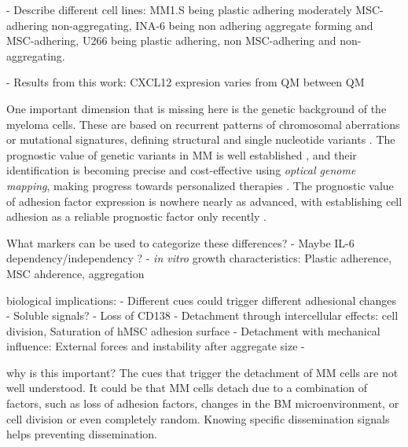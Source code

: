 


% 

\unnsubsection{\cadddiversitytitle}%
\label{sec:discussion_cadddiversity}%

- Describe different cell lines: MM1.S being plastic adhering moderately
MSC-adhering non-aggregating, INA-6 being non adhering aggregate forming and
MSC-adhering, U266 being plastic adhering, non MSC-adhering and
non-aggregating.

- Results from this work: CXCL12 expresion varies from QM between QM

One important dimension that is missing here is the genetic background of the
myeloma cells. These are based on recurrent patterns of chromosomal aberrations
or mutational signatures, defining structural and single nucleotide variants
\cite{kumarMultipleMyelomasCurrent2018a,
      hoangMutationalProcessesContributing2019}. The prognostic value of genetic
variants in MM is well established \cite{sharmaPrognosticRoleMYC2021}, and their
identification is becoming precise and cost-effective using \emph{optical
      genome mapping}, making progress towards personalized therapies
\cite{zouComprehensiveApproachEvaluate2024,
      budurleanIntegratingOpticalGenome2024}. The prognostic value of adhesion factor
expression is nowhere nearly as advanced, with establishing cell adhesion as a
reliable prognostic factor only recently
\cite{huDevelopmentCellAdhesionbased2024}.

What markers can be used to categorize these differences?
- Maybe IL-6 dependency/independency \cite{sprynskiRoleIGF1Major2009}?
- \textit{in vitro} growth characteristics: Plastic adherence, MSC ahderence, aggregation

\unnsubsection{\caddtriggertitle}%
\label{sec:discussion_caddtrigger}%

biological implications:
- Different cues could trigger different adhesional changes
- Soluble signals?
- Loss of CD138 \cite{akhmetzyanovaDynamicCD138Surface2020}
- Detachment through intercellular effects: cell division, Saturation of hMSC adhesion surface
- Detachment with mechanical influence: External forces and instability after aggregate size
-


why is this important?
The cues that trigger the detachment of MM cells are not well understood. It
could be that MM cells detach due to a combination of factors, such as loss of
adhesion factors, changes in the BM microenvironment, or cell division or
even completely random. Knowing specific dissemination signals helps preventing
dissemination.


